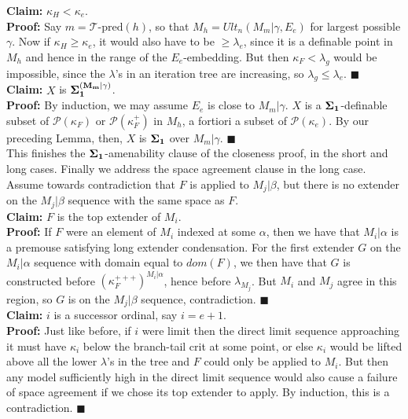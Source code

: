 \documentclass[12pt]{article}
\begin{document}
{\bfseries Claim:} $\kappa_H  < \kappa_e$.\\

\indent \indent \textbf{Proof:} Say $m = \mathscr{T} \text{-pred} (h)$, so that $M_h = Ult_n(M_m | \gamma , E_e )$ for largest possible $\gamma$.  Now if $\kappa_H \geq \kappa_e$, it would also have to be $\geq \lambda_e$, since it is a definable point in $M_h$ and hence in the range of the $E_e$-embedding.  But then $\kappa_F < \lambda_g$ would be impossible, since the $\lambda$'s in an iteration tree are increasing, so $\lambda_g \leq \lambda_e$. $\blacksquare$\\

{\bfseries Claim:} $X$ is $\bf{\Sigma}_1^{(M_m | \gamma )}$.\\

\indent \indent \textbf{Proof:} By induction, we may assume $E_e$ is close to $M_m | \gamma$.  $X$ is a $\bf{\Sigma}_1$-definable subset of $\mathcal{P} (\kappa_F)$ or $\mathcal{P} (\kappa_F^+)$ in $M_h$, a fortiori a subset of $\mathcal{P} (\kappa_e )$.  By our preceding Lemma, then, $X$ is $\bf{\Sigma}_1$ over $M_m | \gamma$. $\blacksquare$\\

This finishes the $\bf{\Sigma}_1$-amenability clause of the closeness proof, in the short and long cases.  Finally we address the space agreement clause in the long case.  Assume towards contradiction that $F$ is applied to $M_j | \beta$, but there is no extender on the $M_j | \beta$ sequence with the same space as $F$.\\

{\bfseries Claim:} $F$ is the top extender of $M_i$.\\

\indent \indent \textbf{Proof:} If $F$ were an element of $M_i$ indexed at some $\alpha$, then we have that $M_i | \alpha$ is a premouse satisfying long extender condensation.  For the first extender $G$ on the $M_i | \alpha$ sequence with domain equal to $dom(F)$, we then have that $G$ is constructed before $(\kappa_F^{+++})^{M_i | \alpha}$, hence before $\lambda_{M_j}$.  But $M_i$ and $M_j$ agree in this region, so $G$ is on the $M_j | \beta$ sequence, contradiction. $\blacksquare$\\

{\bfseries Claim:} $i$ is a successor ordinal, say $i = e + 1$.\\

\indent \indent \textbf{Proof:} Just like before, if $i$ were limit then the direct limit sequence approaching it must have $\kappa_i$ below the branch-tail crit at some point, or else $\kappa_i$ would be lifted above all the lower $\lambda$'s in the tree and $F$ could only be applied to $M_i$.  But then any model sufficiently high in the direct limit sequence would also cause a failure of space agreement if we chose its top extender to apply.  By induction, this is a contradiction. $\blacksquare$\\
\end{document}
